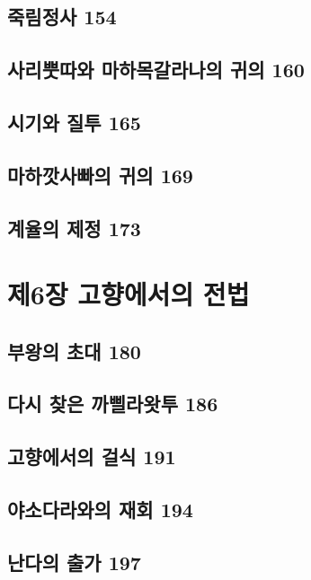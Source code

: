 \documentclass[12pt, a4paper, oneside]{book}
\let\stdsection\section
\renewcommand\section{\newpage\stdsection}
\begin{document}
	\section{죽림정사 154 }

	\section{사리뿟따와 마하목갈라나의 귀의 160 }

	\section{시기와 질투 165 }

	\section{마하깟사빠의 귀의 169 }

	\section{계율의 제정 173}





	\chapter{제6장 고향에서의 전법}
	\noptcrule
	\parttoc				

	\section{부왕의 초대 180 }

	\section{다시 찾은 까삘라왓투 186 }

	\section{고향에서의 걸식 191 }

	\section{야소다라와의 재회 194 }

	\section{난다의 출가 197 }
\end{document}
